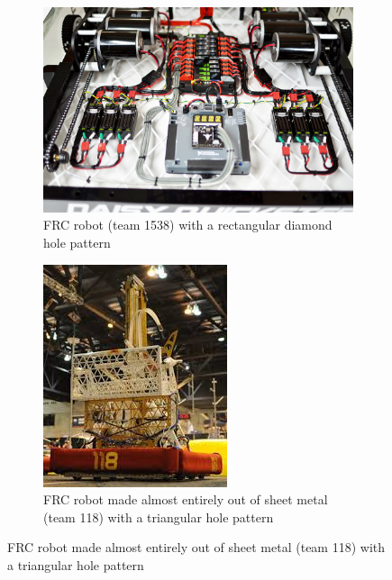 \documentclass[12pt, letterpaper]{article}
\begin{document}
\begin{figure}[H]
	\centering
	\caption{FRC Examples of Hole Patterns}
	\label{fig:frc1}
	\begin{subfigure}[t]{.64\linewidth}
		\includegraphics[width=\linewidth]{frc-ex1}
		\caption{FRC robot (team 1538) with a rectangular diamond hole pattern}
	\end{subfigure}
	\begin{subfigure}[t]{.35\linewidth}
		\includegraphics[width=\linewidth]{frc-ex2}
		\caption{FRC robot made almost entirely out of sheet metal (team 118) with a triangular hole pattern}
	\end{subfigure}
\end{figure}
\end{document}
